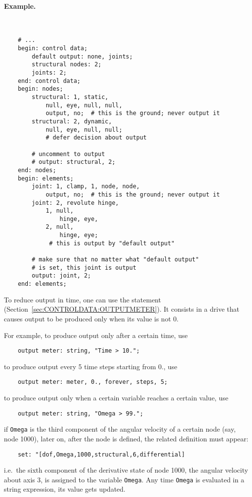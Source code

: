 \paragraph{Example.} \
\begin{verbatim}
    # ...
    begin: control data;
        default output: none, joints;
        structural nodes: 2;
        joints: 2;
    end: control data;
    begin: nodes;
        structural: 1, static,
            null, eye, null, null,
            output, no;  # this is the ground; never output it
        structural: 2, dynamic,
            null, eye, null, null;
            # defer decision about output

        # uncomment to output
        # output: structural, 2;
    end: nodes;
    begin: elements;
        joint: 1, clamp, 1, node, node,
            output, no;  # this is the ground; never output it
        joint: 2, revolute hinge,
            1, null,
                hinge, eye,
            2, null,
                hinge, eye;
             # this is output by "default output"

        # make sure that no matter what "default output"
        # is set, this joint is output
        output: joint, 2;
    end: elements;
\end{verbatim}

To reduce output in time, one can use the  statement
(Section~\ref{sec:CONTROLDATA:OUTPUTMETER}).
It consists in a drive that causes output to be produced only when 
its value is not 0.

For example, to produce output only after a certain time, use
\begin{verbatim}
    output meter: string, "Time > 10.";
\end{verbatim}
to produce output every 5 time steps starting from 0., use
\begin{verbatim}
    output meter: meter, 0., forever, steps, 5;
\end{verbatim}
to produce output only when a certain variable reaches a certain value, use
\begin{verbatim}
    output meter: string, "Omega > 99.";
\end{verbatim}
if \texttt{Omega} is the third component of the angular velocity 
of a certain node (say, node 1000), later on, after the node is defined, 
the related definition must appear:
\begin{verbatim}
    set: "[dof,Omega,1000,structural,6,differential]
\end{verbatim}
i.e.\ the sixth component of the derivative state of node 1000,
the angular velocity about axis 3, is assigned to the variable \texttt{Omega}.
Any time \texttt{Omega} is evaluated in a string expression, its value
gets updated.



